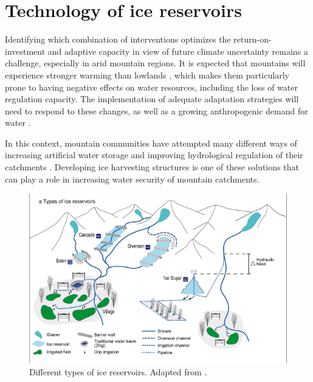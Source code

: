 \chapter{Technology of ice reservoirs}
\label{chap:tech}


Identifying which combination of interventions optimizes the return-on-investment and adaptive capacity in view
of future climate uncertainty remains a challenge, especially in arid mountain regions. It is expected that
mountains will experience stronger warming than lowlands \citep{ragettliContrastingClimateChange2016}, which
makes them particularly prone to having negative effects on water resources, including the loss of water
regulation capacity. The implementation of adequate adaptation strategies will need to respond to these changes,
as well as a growing anthropogenic demand for water \citep{buytaertWaterCitiesImpact2012}.

In this context, mountain communities have attempted many different ways of increasing artificial water storage
and improving hydrological regulation of their catchments \citep{ochoa-tocachiPotentialContributionsPreInca2019,
	ipccChapterHighMountain2019, ipccCrossChapterPaperMountains2022}. Developing ice harvesting structures is one of
these solutions that can play a role in increasing water security of mountain catchments.


\begin{figure}[htb]
	\centering
	\includegraphics[width=\textwidth]{figs/AIR_designs}
	\caption{Different types of ice reservoirs. Adapted from \citet{nusserSociohydrologyArtificialGlaciers2019}.}
	\label{fig:AIRdesigns}
\end{figure}

